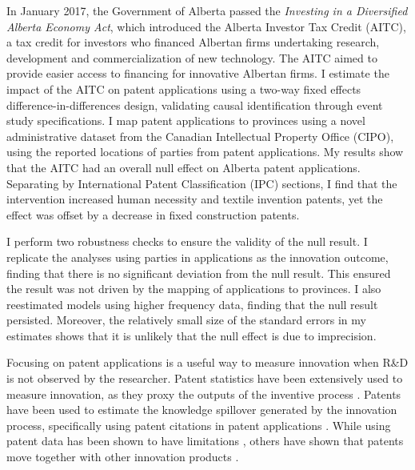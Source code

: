 \documentclass[../main.tex]{subfiles}
\begin{document}
In January 2017, the Government of Alberta passed the \textit{Investing in a Diversified Alberta Economy Act}, which introduced the Alberta Investor Tax Credit (AITC), a tax credit for investors who financed Albertan firms undertaking research, development and commercialization of new technology. The AITC aimed to provide easier access to financing for innovative Albertan firms. I estimate the impact of the AITC on patent applications using a two-way fixed effects difference-in-differences design, validating causal identification through event study specifications. I map patent applications to provinces using a novel administrative dataset from the Canadian Intellectual Property Office (CIPO), using the reported locations of parties from patent applications. My results show that the AITC had an overall null effect on Alberta patent applications. Separating by International Patent Classification (IPC) sections, I find that the intervention increased human necessity and textile invention patents, yet the effect was offset by a decrease in fixed construction patents. 

I perform two robustness checks to ensure the validity of the null result. I replicate the analyses using parties in applications as the innovation outcome, finding that there is no significant deviation from the null result. This ensured the result was not driven by the mapping of applications to provinces. I also reestimated models using higher frequency data, finding that the null result persisted. Moreover, the relatively small size of the standard errors in my estimates shows that it is unlikely that the null effect is due to imprecision.

Focusing on patent applications is a useful way to measure innovation when R\&D is not observed by the researcher. Patent statistics have been extensively used to measure innovation, as they proxy the outputs of the inventive process \parencite{nordhaus69, pavitt85,trajtenberg90,artz_etal10}. Patents have been used to estimate the knowledge spillover generated by the innovation process, specifically using patent citations in patent applications \parencite{trajtenberg90,jaffe_etal93}. While using patent data has been shown to have limitations \parencite{lanjouw_etal98a}, others have shown that patents move together with other innovation products \parencite{lanjouw_schankerman04}.
\end{document}
